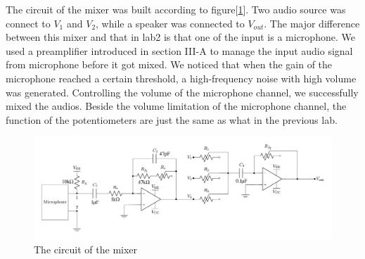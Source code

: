 The circuit of the mixer was built according to figure[\ref{fig:clip}]. Two audio source was connect to $V_1$ and $V_2$, while a speaker was connected to $V_{out}$. The major difference between this mixer and that in lab2 is that one of the input is a microphone. We used a preamplifier introduced in section III-A to manage the input audio signal from microphone before it got mixed. We noticed that when the gain of the microphone reached a certain threshold, a high-frequency noise with high volume was generated. Controlling the volume of the microphone channel, we successfully mixed the audios. Beside the volume limitation of the microphone channel, the function of the potentiometers are just the same as what in the previous lab. 


\begin{figure}[!htbp]
	\centering
	\begin{framed}
		\includegraphics[width=\textwidth]{images/clip.png}
		\caption{The circuit of the mixer}
		\label{fig:clip}
	\end{framed}
\end{figure}